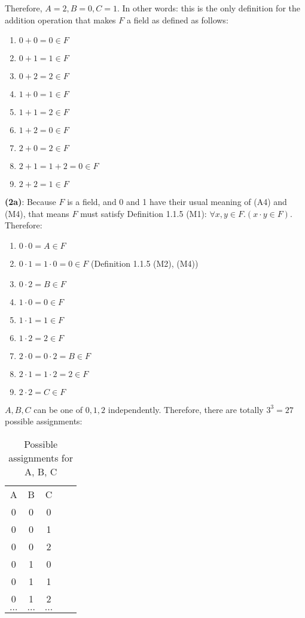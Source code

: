 \documentclass[12pt, letterpaper, oneside]{book}
\begin{document}
Therefore, $A = 2, B = 0, C = 1$. In other words: this is the only definition for the addition operation that makes
$F$ a field as defined as follows:
\begin{enumerate}
  \item $0 + 0 = 0 \in F$
  \item $0 + 1 = 1 \in F$
  \item $0 + 2 = 2 \in F$
  \item $1 + 0 = 1 \in F$
  \item $1 + 1 = 2 \in F$
  \item $1 + 2 = 0 \in F$
  \item $2 + 0 = 2 \in F$
  \item $2 + 1 = 1 + 2 = 0 \in F$
  \item $2 + 2 = 1 \in F$
\end{enumerate}

\textbf{(2a)}: Because $F$ is a field, and 0 and 1 have their usual meaning of (A4) and (M4), that means $F$ must
satisfy Definition 1.1.5 (M1): $\forall x, y \in F. (x \cdot y \in F)$. Therefore:
\begin{enumerate}
  \item $0 \cdot 0 = A \in F$
  \item $0 \cdot 1 = 1 \cdot 0 = 0 \in F$ (Definition 1.1.5 (M2), (M4))
  \item $0 \cdot 2 = B \in F$
  \item $1 \cdot 0 = 0 \in F$
  \item $1 \cdot 1 = 1 \in F$
  \item $1 \cdot 2 = 2 \in F$
  \item $2 \cdot 0 = 0 \cdot 2 = B \in F$
  \item $2 \cdot 1 = 1 \cdot 2 = 2 \in F$
  \item $2 \cdot 2 = C \in F$
\end{enumerate}

$A, B, C$ can be one of $0, 1, 2$ independently. Therefore, there are totally $3^3 = 27$ possible assignments:

\begin{table}[H]
  \centering
  \begin{tabular}{|c|c|c|ll}
    \cline{1-3}
    A        & B        & C        &  & \\ [1ex] \cline{1-3}
    0        & 0        & 0        &  & \\ [0.5ex] \cline{1-3}
    0        & 0        & 1        &  & \\ [0.5ex] \cline{1-3}
    0        & 0        & 2        &  & \\ [0.5ex] \cline{1-3}
    0        & 1        & 0        &  & \\ [0.5ex] \cline{1-3}
    0        & 1        & 1        &  & \\ [0.5ex] \cline{1-3}
    0        & 1        & 2        &  & \\ [0.5ex] \cline{1-3}
    $\ldots$ & $\ldots$ & $\ldots$ &  & \\ [0.5ex] \cline{1-3}
  \end{tabular}
  \caption{Possible assignments for A, B, C}
  \label{table:1.1.8-2a}
\end{table}
\end{document}
